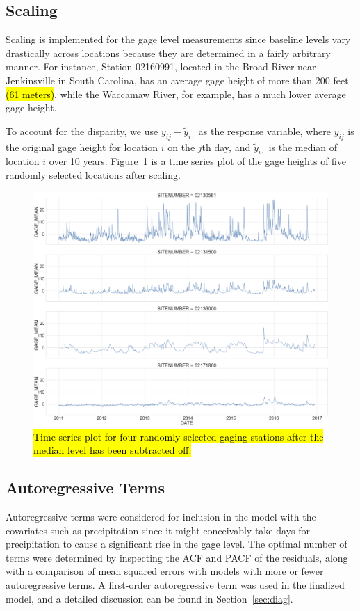 \subsection{Scaling}\label{subsec:scaling}
Scaling is implemented for the gage level measurements since baseline levels vary drastically across locations because they are determined in a fairly arbitrary manner.
For instance, Station 02160991,  located in the Broad River near Jenkinsville in South Carolina, has an average gage height of more than 200 feet \hl{(61 meters)}, while the Waccamaw River, for example, has a much lower average gage height.

To account for the disparity, we use $ y_{ij} -\tilde{y}_{i\cdot}$ as the response variable, where $ y_{ij}$ is the original gage height  for location $i$ on the $ j$th day, and $\tilde{y}_{i\cdot}$ is the median of location $i$ over 10 years.
Figure~\ref{fig:ts_plot_gage} is a time series plot of the gage heights of five randomly selected locations after scaling.

\begin{figure}[htbp]
 \begin{center}
\includegraphics[width=1\textwidth]{../images/time_series_plots_four_stations.png}
\caption{\hl{Time series plot for four randomly selected gaging stations after the median level has been subtracted off.}}
\label{fig:ts_plot_gage}
 \end{center}
\end{figure}

\subsection{Autoregressive Terms}\label{subsec:autoregressive-terms}
Autoregressive terms were considered for inclusion in the model with the covariates such as precipitation since it might conceivably take days for precipitation to cause a significant rise in the gage level.
The optimal number of terms were determined by inspecting the ACF and PACF of the residuals, along with a comparison of mean squared errors with models with more or fewer autoregressive terms.
A first-order autoregressive term was used in the finalized model, and a detailed discussion can be found in Section~\ref{sec:diag}.

